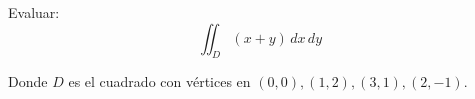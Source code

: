 Evaluar: 
    \[
        \iint_D (x+y) \, dx \, dy
    \]
    
Donde $D$ es el cuadrado con vértices en $(0,0),(1,2),(3,1),(2,-1)$.
